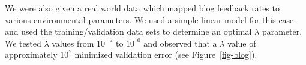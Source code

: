 \documentclass[11pt]{article}   %
\theoremstyle{plain}
\begin{document}
We were also given a real world data which mapped blog feedback rates to various environmental parameters. We used a simple linear model for this case and used the training/validation data sets to determine an optimal $\lambda$ parameter. We tested $\lambda$ values from $10^{-7}$ to $10^{10}$ and observed that a $\lambda$ value of approximately $10^7$ minimized validation error (see Figure~\ref{fig-blog}).
\end{document}
